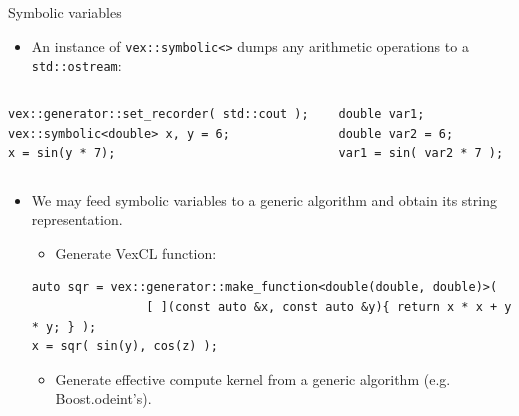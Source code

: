 \documentclass[@BEAMER_OPTIONS@]{beamer}
\newcommand{\code}[1]{\lstinline|#1|}
\begin{document}
\note{}

\begin{frame}[fragile]{Symbolic variables}
    \begin{itemize}
        \item An instance of \code{vex::symbolic<>} dumps any arithmetic
            operations to a \code{std::ostream}:
            \vspace{-0.5\baselineskip}
    \end{itemize}
    \begin{columns}
        \begin{column}{0.45\textwidth}
            \begin{exampleblock}{}
                \begin{lstlisting}
vex::generator::set_recorder( std::cout );
vex::symbolic<double> x, y = 6;
x = sin(y * 7);
                \end{lstlisting}
            \end{exampleblock}
        \end{column}
        \begin{column}{0.45\textwidth}
            \begin{exampleblock}{}
                \begin{verbatim}
double var1;
double var2 = 6;
var1 = sin( var2 * 7 );
                \end{verbatim}
            \end{exampleblock}
        \end{column}
    \end{columns}
    \vspace{\baselineskip}
    \begin{itemize}
        \item We may feed symbolic variables to a generic algorithm and obtain
            its string representation.
            \begin{itemize}
                \item Generate VexCL function:
            \end{itemize}
    \begin{exampleblock}{}
        \begin{lstlisting}
auto sqr = vex::generator::make_function<double(double, double)>(
                [ ](const auto &x, const auto &y){ return x * x + y * y; } );
x = sqr( sin(y), cos(z) );
        \end{lstlisting}
    \end{exampleblock}
    \begin{itemize}
        \item Generate effective compute kernel from a generic algorithm (e.g.
            Boost.odeint's).
    \end{itemize}
    \end{itemize}
\end{frame}
\end{document}

